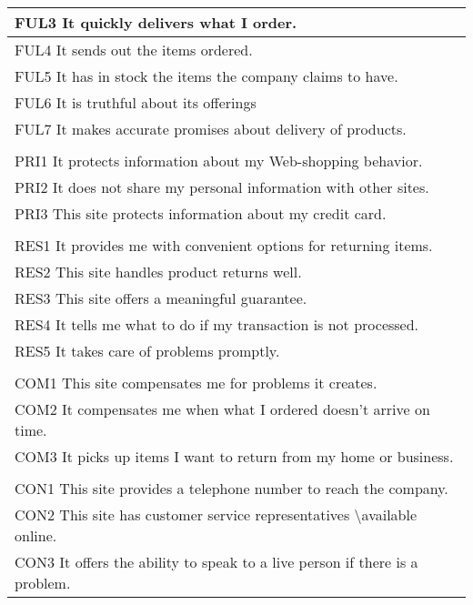 \begin{anexosenv}
\begin{table}[]
{\begin{tabular}{|l|}
FUL3 It quickly delivers what I order. \\ \hline
FUL4 It sends out the items ordered. \\ \hline
FUL5 It has in stock the items the company claims to have. \\ \hline
FUL6 It is truthful about its offerings \\ \hline
FUL7 It makes accurate promises about delivery of products. \\ \hline
\rowcolor[HTML]{C0C0C0} 
\multicolumn{1}{|c|}{\cellcolor[HTML]{C0C0C0}Privacy} \\ \hline
PRI1 It protects information about my Web-shopping behavior. \\ \hline
PRI2 It does not share my personal information with other sites. \\ \hline
PRI3 This site protects information about my credit card. \\ \hline
\rowcolor[HTML]{C0C0C0} 
\multicolumn{1}{|c|}{\cellcolor[HTML]{C0C0C0}Responsiveness} \\ \hline
RES1 It provides me with convenient options for returning items. \\ \hline
RES2 This site handles product returns well. \\ \hline
RES3 This site offers a meaningful guarantee. \\ \hline
RES4 It tells me what to do if my transaction is not processed. \\ \hline
RES5 It takes care of problems promptly. \\ \hline
\rowcolor[HTML]{C0C0C0} 
\multicolumn{1}{|c|}{\cellcolor[HTML]{C0C0C0}Compensation} \\ \hline
COM1 This site compensates me for problems it creates. \\ \hline
COM2 It compensates me when what I ordered doesn’t arrive on time. \\ \hline
COM3 It picks up items I want to return from my home or business. \\ \hline
\rowcolor[HTML]{C0C0C0} 
\multicolumn{1}{|c|}{\cellcolor[HTML]{C0C0C0}Contact} \\ \hline
CON1 This site provides a telephone number to reach the company. \\ \hline
CON2 This site has customer service representatives \textbackslash{}available online. \\ \hline
CON3 It offers the ability to speak to a live person if there is a problem. \\ \hline
\end{tabular}%
}
\end{table}


\end{anexosenv}
